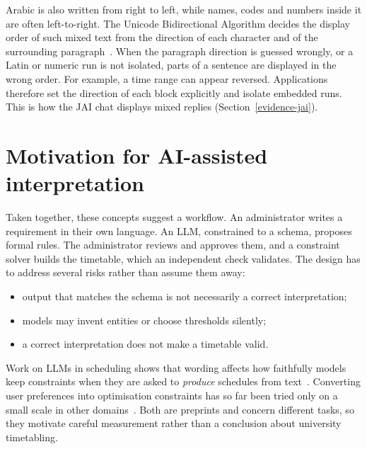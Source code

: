Arabic is also written from right to left, while names, codes and numbers inside it are often left-to-right. The Unicode Bidirectional Algorithm decides the display order of such mixed text from the direction of each character and of the surrounding paragraph~\cite{unicode_uax9}. When the paragraph direction is guessed wrongly, or a Latin or numeric run is not isolated, parts of a sentence are displayed in the wrong order. For example, a time range can appear reversed. Applications therefore set the direction of each block explicitly and isolate embedded runs. This is how the JAI chat displays mixed replies (Section~\ref{evidence-jai}).

\section{Motivation for AI-assisted interpretation}\label{motivation-for-ai-assisted-extraction}

Taken together, these concepts suggest a workflow. An administrator writes a requirement in their own language. An LLM, constrained to a schema, proposes formal rules. The administrator reviews and approves them, and a constraint solver builds the timetable, which an independent check validates. The design has to address several risks rather than assume them away:
\begin{itemize}
\item output that matches the schema is not necessarily a correct interpretation;
\item models may invent entities or choose thresholds silently;
\item a correct interpretation does not make a timetable valid.
\end{itemize}
Work on LLMs in scheduling shows that wording affects how faithfully models keep constraints when they are asked to \emph{produce} schedules from text~\cite{sharma2026schedbench}. Converting user preferences into optimisation constraints has so far been tried only on a small scale in other domains~\cite{sanguinetti2025preferences}. Both are preprints and concern different tasks, so they motivate careful measurement rather than a conclusion about university timetabling.
